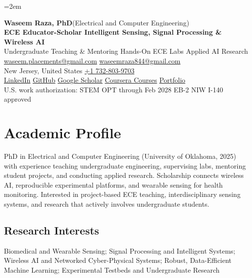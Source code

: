\documentclass[10pt,letterpaper]{extarticle}
\begin{document}
\emergencystretch=2em
\begin{center}
{\LARGE\bfseries Waseem Raza, PhD}{\normalsize\mdseries \enspace (Electrical and Computer Engineering)}\\[2pt]
{\large\bfseries ECE Educator-Scholar \textbar{} Intelligent Sensing, Signal Processing \& Wireless AI}\\[1pt]
{\small Undergraduate Teaching \& Mentoring \textbar{} Hands-On ECE Labs \textbar{} Applied AI Research}\\[3pt]
{\footnotesize {}\enspace \href{mailto:waseem.placements@gmail.com}{waseem.placements@gmail.com} \textbar{} \href{mailto:waseemraza844@gmail.com}{waseemraza844@gmail.com}\\[1pt]New Jersey, United States \quad {}\enspace \href{tel:+17328039703}{+1 732-803-9703}\\[1pt]\href{https://www.linkedin.com/in/waseem-raza-phd-9a737858/}{LinkedIn} \textbar{} \href{https://github.com/WaseemRaza844}{GitHub} \textbar{} \href{https://scholar.google.com/citations?user=d58Drr0AAAAJ\&hl=en}{Google Scholar} \textbar{} \href{https://waseemraza844.github.io/portfolio/learning.html}{Coursera Courses} \textbar{} \href{https://waseemraza844.github.io/portfolio/}{Portfolio}\\[1pt]{\scriptsize U.S. work authorization: STEM OPT through Feb 2028 \textbar{} EB-2 NIW I-140 approved}}
\end{center}
\vspace{-5pt}
\section{Academic Profile}
PhD in Electrical and Computer Engineering (University of Oklahoma, 2025) with experience teaching undergraduate engineering, supervising labs, mentoring student projects, and conducting applied research. Scholarship connects wireless AI, reproducible experimental platforms, and wearable sensing for health monitoring. Interested in project-based ECE teaching, interdisciplinary sensing systems, and research that actively involves undergraduate students.
\subsection{Research Interests}
Biomedical and Wearable Sensing; Signal Processing and Intelligent Systems; Wireless AI and Networked Cyber-Physical Systems; Robust, Data-Efficient Machine Learning; Experimental Testbeds and Undergraduate Research\par
{}
\end{document}

